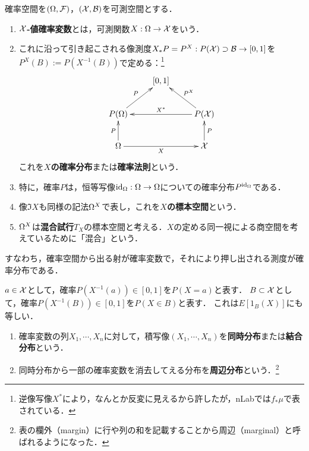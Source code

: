 \documentclass[uplatex,dvipdfmx]{jsreport}
\begin{document}
\begin{definition}
    確率空間を$(\Omega,\mathcal{F})$，$(\mathcal{X},\mathcal{B})$を可測空間とする．
    \begin{enumerate}
        \item \textbf{$\mathcal{X}$-値確率変数}とは，可測関数$X:\Omega\to\mathcal{X}$をいう．
        \item これに沿って引き起こされる像測度$X_*P=P^X:P(\mathcal{X})\supset\mathcal{B}\to[0,1]$を$P^X(B):=P(X^{-1}(B))$で定める：\footnote{逆像写像$X^*$により，なんとか反変に見えるから許したが，nLabでは$f_*\mu$で表されている．}
        \[\xymatrix{
            &{[0,1]}\\
            P(\Omega)\ar[ur]^-{P}&&P(\X)\ar[ul]_-{P^X}\ar[ll]_-{X^*}\\
            \Omega\ar[u]^-{P}\ar[rr]_-X&&\X\ar[u]_-P
        }\]
        これを\textbf{$X$の確率分布}または\textbf{確率法則}という．
        \item 特に，確率$P$は，恒等写像$\mathrm{id}_\Omega:\Omega\to\Omega$についての確率分布$P^{\mathrm{id}_\Omega}$である．
        \item 像$\Im X$も同様の記法$\Omega^X$で表し，これを\textbf{$X$の標本空間}という．
        \item $\Omega^X$は\textbf{混合試行}$T_X$の標本空間と考える．$X$の定める同一視による商空間を考えているために「混合」という．
    \end{enumerate}
\end{definition}
\begin{remarks}[Kolmogorov 1933]
    すなわち，確率空間から出る射が確率変数で，それにより押し出される測度が確率分布である．
\end{remarks}
\begin{notation}
    $a\in\mathcal{X}$として，確率$P(X^{-1}(a))\in[0,1]$を$P(X=a)$と表す．
    $B\subset\mathcal{X}$として，確率$P(X^{-1}(B))\in[0,1]$を$P(X\in B)$と表す．
    これは$E[1_B(X)]$にも等しい．
\end{notation}

\begin{definition}\mbox{}
    \begin{enumerate}
        \item 確率変数の列$X_1,\cdots,X_n$に対して，積写像$(X_1,\cdots,X_n)$を\textbf{同時分布}または\textbf{結合分布}という．
        \item 同時分布から一部の確率変数を消去してえる分布を\textbf{周辺分布}という．\footnote{表の欄外（margin）に行や列の和を記載することから周辺（marginal）と呼ばれるようになった．}
    \end{enumerate}
\end{definition}
\end{document}
